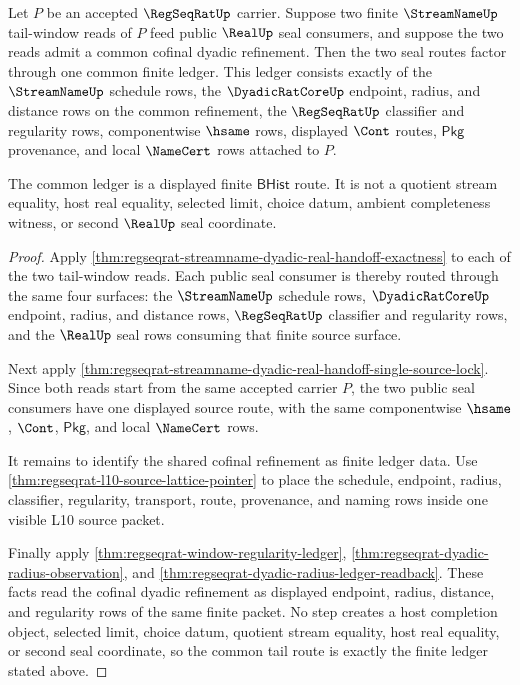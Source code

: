 \begin{theorem}
\label{thm:regseqrat-common-dyadic-tail-ledger}
Let $P$ be an accepted $\RegSeqRatUp$ carrier. Suppose two finite
$\StreamNameUp$ tail-window reads of $P$ feed public $\RealUp$ seal consumers,
and suppose the two reads admit a common cofinal dyadic refinement. Then the
two seal routes factor through one common finite ledger. This ledger consists
exactly of the $\StreamNameUp$ schedule rows, the $\DyadicRatCoreUp$ endpoint,
radius, and distance rows on the common refinement, the $\RegSeqRatUp$
classifier and regularity rows, componentwise $\hsame$ rows, displayed $\Cont$
routes, $\mathsf{Pkg}$ provenance, and local $\NameCert$ rows attached to $P$.

The common ledger is a displayed finite $\mathsf{BHist}$ route. It is not a
quotient stream equality, host real equality, selected limit, choice datum,
ambient completeness witness, or second $\RealUp$ seal coordinate.
\end{theorem}
\begin{proof}
Apply \autoref{thm:regseqrat-streamname-dyadic-real-handoff-exactness} to each
of the two tail-window reads. Each public seal consumer is thereby routed
through the same four surfaces: the $\StreamNameUp$ schedule rows,
$\DyadicRatCoreUp$ endpoint, radius, and distance rows, $\RegSeqRatUp$
classifier and regularity rows, and the $\RealUp$ seal rows consuming that
finite source surface.

Next apply
\autoref{thm:regseqrat-streamname-dyadic-real-handoff-single-source-lock}. Since
both reads start from the same accepted carrier $P$, the two public seal
consumers have one displayed source route, with the same componentwise
$\hsame$, $\Cont$, $\mathsf{Pkg}$, and local $\NameCert$ rows.

It remains to identify the shared cofinal refinement as finite ledger data.
Use \autoref{thm:regseqrat-l10-source-lattice-pointer} to place the schedule,
endpoint, radius, classifier, regularity, transport, route, provenance, and
naming rows inside one visible L10 source packet.

Finally apply \autoref{thm:regseqrat-window-regularity-ledger},
\autoref{thm:regseqrat-dyadic-radius-observation}, and
\autoref{thm:regseqrat-dyadic-radius-ledger-readback}. These facts read the
cofinal dyadic refinement as displayed endpoint, radius, distance, and
regularity rows of the same finite packet. No step creates a host completion
object, selected limit, choice datum, quotient stream equality, host real
equality, or second seal coordinate, so the common tail route is exactly the
finite ledger stated above.
\end{proof}

